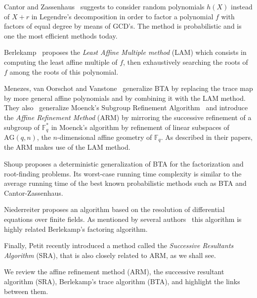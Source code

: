 \documentclass{sig-alternate}
\newcommand{\qq}{q}
\newcommand{\nn}{n}
\newcommand{\AG}{\mathrm{AG}(\qq,\nn)}
\newcounter{algo}
\renewcommand{\paragraph}[1]{\smallskip\noindent{{\bf \rm #1.}}}
\begin{document}
Cantor and Zassenhaus~\cite{cantor1981} suggests to consider random polynomials $h(X)$ instead of $X+r$ in Legendre's decomposition in order to factor a polynomial $f$ with factors of equal degree by means of GCD's. The method is probabilistic and is one the most efficient methods today.

Berlekamp~\cite{mBER84a} proposes the \emph{Least Affine Multiple method} (LAM) which consists in computing the least affine multiple of $f$, then exhaustively searching the roots of $f$ among the roots of this polynomial. 

Menezes, van Oorschot and Vanstone~\cite{MenezesOV88,OorschotV89} generalize BTA by replacing the trace map by more general affine polynomials and by combining it with the LAM method. They also~\cite{Menvanovans92} generalize Moenck's Subgroup Refinement Algorithm~\cite{Moenck77} and 
introduce the \emph{Affine Refinement Method} (ARM) by mirroring the successive refinement of a subgroup of $\mathbb{F}_{\qq}^\ast$ in Moenck's algorithm 
by refinement of linear subspaces of $\AG$, the $\nn$-dimensional affine geometry of $\mathbb{F}_{\qq}$. %
As described in their papers, the ARM makes use of the LAM method.

Shoup\cite{Shoup91b} proposes a deterministic generalization of BTA for the factorization and root-finding problems. Its worst-case running time complexity is similar to the average running time of the best known probabilistic methods such as BTA and Cantor-Zassenhaus.

Niederreiter\cite{nied94} proposes an algorithm based on the resolution of differential equations over finite fields.  As mentioned by several authors~\cite{Fleis96} this algorithm is highly related Berlekamp's factoring algorithm.


Finally, Petit\cite{cgUCL-P14} recently introduced a method called the \emph{Successive Resultants Algorithm} (SRA), that is also closely related to ARM, as we shall see.






\paragraph{Our contribution}
We review the affine refinement method (ARM), the successive resultant algorithm (SRA), Berlekamp's trace algorithm (BTA), and highlight the links between them.
\end{document}
